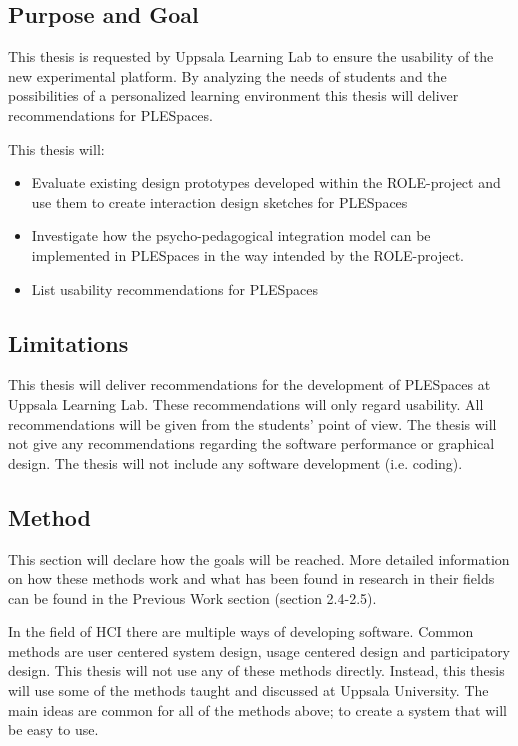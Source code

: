 \subsection {Purpose and Goal}
This thesis is requested by Uppsala Learning Lab to ensure the usability of the new experimental platform. By analyzing the needs of students and the possibilities of a personalized learning environment this thesis will deliver recommendations for PLESpaces.

This thesis will:
\begin {itemize}
	\item Evaluate existing design prototypes developed within the ROLE-project and use them to create interaction design sketches for PLESpaces
	\item Investigate how the psycho-pedagogical integration model can be implemented in PLESpaces in the way intended by the ROLE-project.
	\item List usability recommendations for PLESpaces
\end {itemize}

\subsection {Limitations}
This thesis will deliver recommendations for the development of PLESpaces at Uppsala Learning Lab. These recommendations will only regard usability. All recommendations will be given from the students' point of view.
The thesis will not give any recommendations regarding the software performance or graphical design. The thesis will not include any software development (i.e. coding). 

\subsection {Method}
This section will declare how the goals will be reached. More detailed information on how these methods work and what has been found in research in their fields can be found in the Previous Work section (section 2.4-2.5).

In the field of HCI there are multiple ways of developing software. Common methods are user centered system design, usage centered design and participatory design. This thesis will not use any of these methods directly. Instead, this thesis will use some of the methods taught and discussed at Uppsala University. The main ideas are common for all of the methods above; to create a system that will be easy to use.

